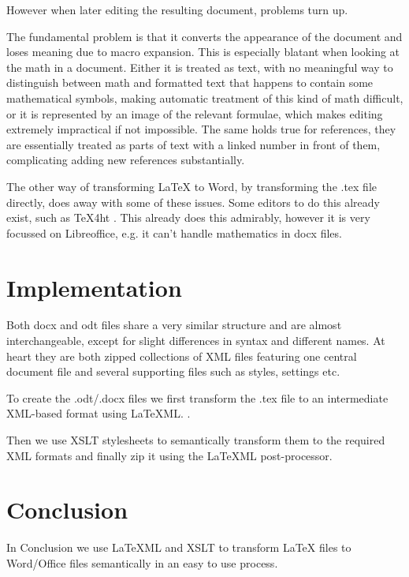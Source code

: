 \documentclass{llncs}
\begin{document}
 However when later editing the resulting document, problems turn up.

The fundamental problem is that it converts the appearance of the document and loses
meaning due to macro expansion. This is especially blatant when looking at the math in a
document. Either it is treated as text, with no meaningful way to distinguish between math
and formatted text that happens to contain some mathematical symbols, making automatic
treatment of this kind of math difficult, or it is represented by an image of the relevant
formulae, which makes editing extremely impractical if not impossible. The same holds true
for references, they are essentially treated as parts of text with a linked number in
front of them, complicating adding new references substantially. 

The other way of transforming {\LaTeX} to Word, by transforming the .tex file directly,
does away with some of these issues. Some editors to do this already exist, such as TeX4ht
. This already does this admirably, however
it is very focussed on Libreoffice, e.g. it can't handle mathematics in docx files. 

\section{Implementation}\label{sec:impl}

Both docx and odt files share a very similar structure and are almost interchangeable,
except for slight differences in syntax and different names. At heart they are both zipped
collections of XML files featuring one central document file and several supporting files
such as styles, settings etc. 

To create the .odt/.docx files we first transform the .tex file to an intermediate
XML-based format using {\LaTeX}ML. .

Then we use XSLT stylesheets to semantically transform them to the required XML formats
and finally zip it using the {\LaTeX}ML post-processor. 


\section{Conclusion}\label{sec:concl}
In Conclusion we use {\LaTeX}ML and XSLT to transform {\LaTeX} files to Word/Office files
semantically in an easy to use process.  
\printbibliography
\end{document}
